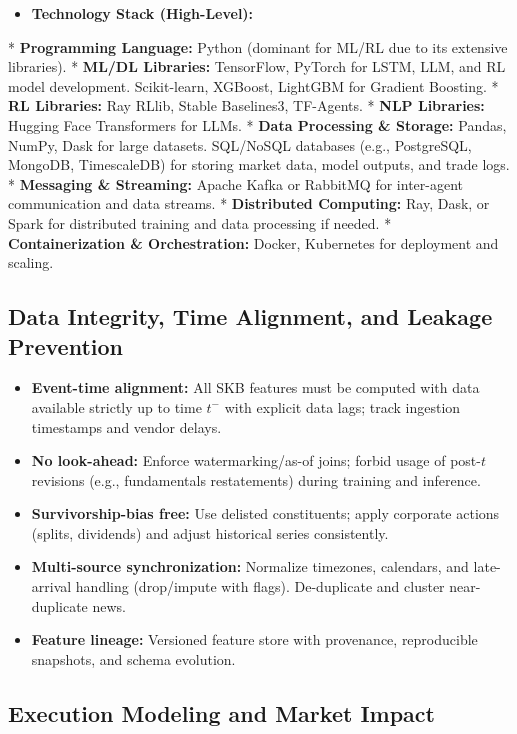 \documentclass[11pt]{article}
\begin{document}
\begin{itemize}
\item   \textbf{Technology Stack (High-Level):}
\end{itemize}
    *   \textbf{Programming Language:} Python (dominant for ML/RL due to its extensive libraries).
    *   \textbf{ML/DL Libraries:} TensorFlow, PyTorch for LSTM, LLM, and RL model development. Scikit-learn, XGBoost, LightGBM for Gradient Boosting.
    *   \textbf{RL Libraries:} Ray RLlib, Stable Baselines3, TF-Agents.
    *   \textbf{NLP Libraries:} Hugging Face Transformers for LLMs.
    *   \textbf{Data Processing \& Storage:} Pandas, NumPy, Dask for large datasets. SQL/NoSQL databases (e.g., PostgreSQL, MongoDB, TimescaleDB) for storing market data, model outputs, and trade logs.
    *   \textbf{Messaging \& Streaming:} Apache Kafka or RabbitMQ for inter-agent communication and data streams.
    *   \textbf{Distributed Computing:} Ray, Dask, or Spark for distributed training and data processing if needed.
    *   \textbf{Containerization \& Orchestration:} Docker, Kubernetes for deployment and scaling.

\subsection{Data Integrity, Time Alignment, and Leakage Prevention}

\begin{itemize}
\item   \textbf{Event-time alignment:} All SKB features must be computed with data available strictly up to time $t^{-}$ with explicit data lags; track ingestion timestamps and vendor delays.
\item   \textbf{No look-ahead:} Enforce watermarking/as-of joins; forbid usage of post-$t$ revisions (e.g., fundamentals restatements) during training and inference.
\item   \textbf{Survivorship-bias free:} Use delisted constituents; apply corporate actions (splits, dividends) and adjust historical series consistently.
\item   \textbf{Multi-source synchronization:} Normalize timezones, calendars, and late-arrival handling (drop/impute with flags). De-duplicate and cluster near-duplicate news.
\item   \textbf{Feature lineage:} Versioned feature store with provenance, reproducible snapshots, and schema evolution.

\end{itemize}
\subsection{Execution Modeling and Market Impact}
\end{document}
